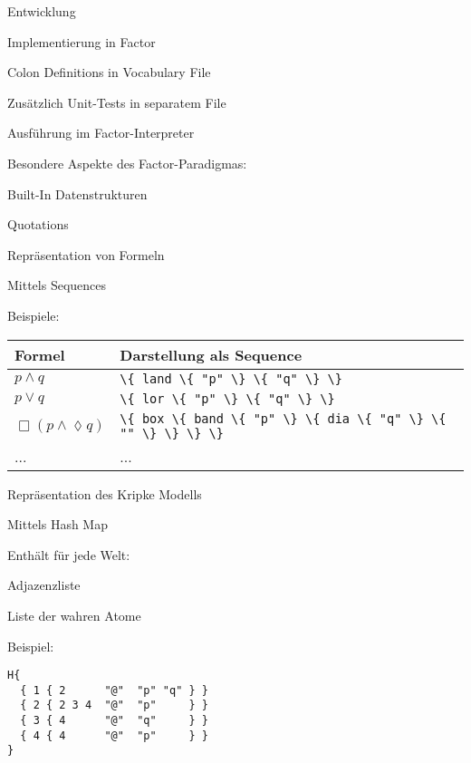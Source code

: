 \begin{frame}{Entwicklung}
\bi
  \item Implementierung in Factor
  \item Colon Definitions in Vocabulary File
  \item Zus\"atzlich Unit-Tests in separatem File
  \item Ausf\"uhrung im Factor-Interpreter
  \item Besondere Aspekte des Factor-Paradigmas:
  \bi
    \item Built-In Datenstrukturen
    \item Quotations
  \ei
\ei
\end{frame}

\begin{frame}{Repr\"asentation von Formeln}
\bi
  \item Mittels Sequences
  \item Beispiele:
\ei

\begin{center}
\begin{tabular}{l|l}
Formel & Darstellung als Sequence \\
\hline
$p \wedge q$ & \lstinline!\{ land \{ "p" \} \{ "q" \} \}! \\
$p \vee q$ & \lstinline!\{ lor \{ "p" \} \{ "q" \} \}! \\
$\Box (p \wedge \lozenge q)$ & \lstinline!\{ box \{ band \{ "p" \} \{ dia \{ "q" \} \{ "" \} \} \} \}! \\
... & ...
\end{tabular}
\end{center}
\end{frame}

\begin{frame}[fragile]{Repr\"asentation des Kripke Modells}
\bi
  \item Mittels Hash Map
  \item Enth\"alt f\"ur jede Welt:
  \bi
    \item Adjazenzliste
    \item Liste der wahren Atome
  \ei
  \item Beispiel:
\ei

\begin{lstlisting}[xleftmargin=50pt]
H{
  { 1 { 2      "@"  "p" "q" } }
  { 2 { 2 3 4  "@"  "p"     } }
  { 3 { 4      "@"  "q"     } }
  { 4 { 4      "@"  "p"     } }
}
\end{lstlisting}
\end{frame}

\begin{frame}[c,allowframebreaks]
\begin{center}
\Huge
{}
\end{center}
\end{frame}